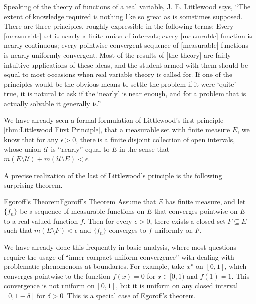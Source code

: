 \documentclass[../main.tex]{subfiles}
\begin{document}
Speaking of the theory of functions of a real variable, J. E. Littlewood says, ``The extent of knowledge required is nothing like so great as is sometimes supposed. There are three principles, roughly expressible in the following terms: Every [measurable] set is nearly a finite union of intervals; every [measurable] function is nearly continuous; every pointwise convergent sequence of [measurable] functions is nearly uniformly convergent. Most of the results of [the theory] are fairly intuitive applications of these ideas, and the student armed with them should be equal to most occasions when real variable theory is called for. If one of the principles would be the obvious means to settle the problem if it were `quite' true, it is natural to ask if the `nearly' is near enough, and for a problem that is actually solvable it generally is.''

We have already seen a formal formulation of Littlewood's first principle, \ref{thm:Littlewood First Principle}, that a measurable set with finite measure $E$, we know that for any $\epsilon > 0$, there is a finite disjoint collection of open intervals, whose union $\mathcal{U}$ is ``nearly'' equal to $E$ in the sense that $m(E \setminus \mathcal{U}) + m(\mathcal{U} \setminus E) < \epsilon$.

A precise realization of the last of Littlewood's principle is the following surprising theorem.

\begin{theorem}{Egoroff's Theorem}{Egoroff's Theorem}
	Assume that $E$ has finite measure, and let $\{f_n\}$ be a sequence of measurable functions on $E$ that converges pointwise on $E$ to a real-valued function $f$. Then for every $\epsilon > 0$, there exists a closed set $F \subseteq E$ such that $m(E \setminus F) < \epsilon$ and $\{f_n\}$ converges to $f$ uniformly on $F$.
\end{theorem}

\begin{remark}
	We have already done this frequently in basic analysis, where most questions require the usage of ``inner compact uniform convergence'' with dealing with problematic phenomenons at boundaries. For example, take $x^n$ on $[0,1]$, which converges pointwise to the function $f(x) = 0$ for $x \in [0,1)$ and $f(1) = 1$. This convergence is not uniform on $[0,1]$, but it is uniform on any closed interval $[0, 1 - \delta]$ for $\delta > 0$. This is a special case of Egoroff's theorem.
\end{remark}
\end{document}
